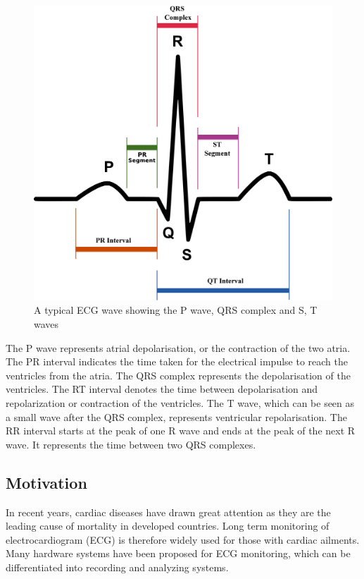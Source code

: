 \documentclass[11pt]{article}
\theoremstyle{definition}
\begin{document}
  \begin{figure}
    \centering
    \includegraphics[scale=0.2]{images/SinusRhythmLabels.jpg}
    \caption{A typical ECG wave showing the P wave, QRS complex and S, T waves\cite{wiki:SinusRythmLabels}}
    \label{fig:pqrst}
  \end{figure}

  The P wave represents atrial depolarisation, or the contraction of the two atria.
  The PR interval indicates the time taken for the electrical impulse to reach the ventricles from the atria.
  The QRS complex represents the depolarisation of the ventricles.
  The RT interval denotes the time between depolarisation and repolarization or contraction of the ventricles.
  The T wave, which can be seen as a small wave after the QRS complex, represents ventricular repolarisation.
  The RR interval starts at the peak of one R wave and ends at the peak of the next R wave. It represents the time between two QRS complexes.

\subsection{Motivation}

  In recent years, cardiac diseases have drawn great attention as they are the leading cause of mortality in developed countries.
  Long term monitoring of electrocardiogram (ECG) is therefore widely used for those with cardiac ailments.
  Many hardware systems have been proposed for ECG monitoring, which can be differentiated into recording and analyzing systems.
\end{document}
